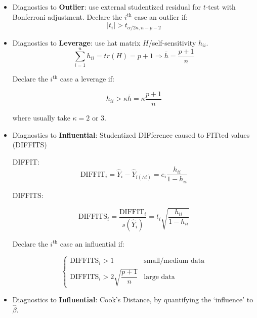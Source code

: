 \begin{itemize}[topsep=2pt,itemsep=0pt]
    \item Diagnostics to \textbf{Outlier}: use external studentized residual for $ t $-test with Bonferroni adjustment. Declare the $ i^\mathrm{th} $ case an outlier if: 
    \begin{equation}
         |t_i|>t_{\alpha/2n,n-p-2}
    \end{equation}
    \item Diagnostics to \textbf{Leverage}: use hat matrix $ H $/self-sensitivity $ h_{ii} $.
    \begin{equation}
        \sum_{i=1}^n h_{ii}=tr(H)=p+1 \Rightarrow \bar{h}=\dfrac{p+1}{n} 
    \end{equation}
    
    Declare the $ i^\mathrm{th}  $ case a {leverage} if:
    
    \begin{equation}
        h_{ii}>\kappa \bar{h}=\kappa \dfrac{p+1}{n} 
    \end{equation}
    
    where usually take $ \kappa =2 $ or $ 3 $.
    \item Diagnostics to \textbf{Influential}: Studentized DIFference caused to FITted values (DIFFITS)
    
    DIFFIT:
    \begin{equation}
        \mathrm{DIFFIT}_i=\hat{Y}_i-\hat{Y}_{i(\wedge i)}=e_i\dfrac{h_{ii}}{1-h_{ii}} 
    \end{equation}

    DIFFITS:
    
    \begin{equation}
        \mathrm{DIFFITS}_i=\dfrac{\mathrm{DIFFIT}_i}{s(\hat{Y}_i)}=t_i\sqrt{\dfrac{h_{ii}}{1-h_{ii}}}
    \end{equation}
    
    Declare the $ i^\mathrm{th}  $ case an {influential} if:
    
    \begin{equation}
        \begin{cases}
            \mathrm{DIFFITS}_i>1&\text{small/medium data} \\
            \mathrm{DIFFITS}_i>2\sqrt{\dfrac{p+1}{n}}&\text{large data}
        \end{cases}   
    \end{equation}
    
    \item Diagnostics to \textbf{Influential}: Cook's Distance, by quantifying the `influence' to $ \hat{\beta } $.
    

\end{itemize}
